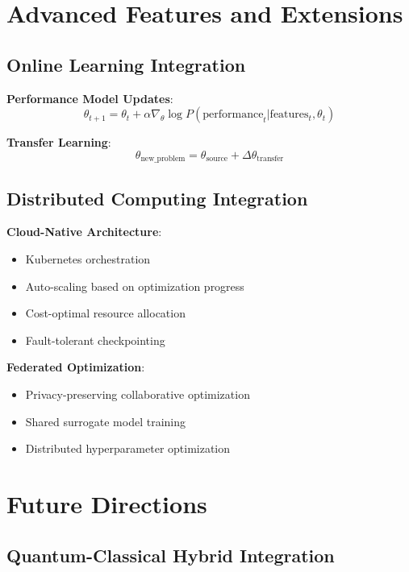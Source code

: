 \documentclass[11pt,a4paper]{article}
\begin{document}
\section{Advanced Features and Extensions}

\subsection{Online Learning Integration}

\textbf{Performance Model Updates}:
\begin{equation}
\theta_{t+1} = \theta_t + \alpha \nabla_\theta \log P(\text{performance}_t | \text{features}_t, \theta_t)
\end{equation}

\textbf{Transfer Learning}:
\begin{equation}
\theta_{\text{new\_problem}} = \theta_{\text{source}} + \Delta\theta_{\text{transfer}}
\end{equation}

\subsection{Distributed Computing Integration}

\textbf{Cloud-Native Architecture}:
\begin{itemize}
\item Kubernetes orchestration
\item Auto-scaling based on optimization progress
\item Cost-optimal resource allocation
\item Fault-tolerant checkpointing
\end{itemize}

\textbf{Federated Optimization}:
\begin{itemize}
\item Privacy-preserving collaborative optimization
\item Shared surrogate model training
\item Distributed hyperparameter optimization
\end{itemize}

\section{Future Directions}

\subsection{Quantum-Classical Hybrid Integration}
\end{document}
